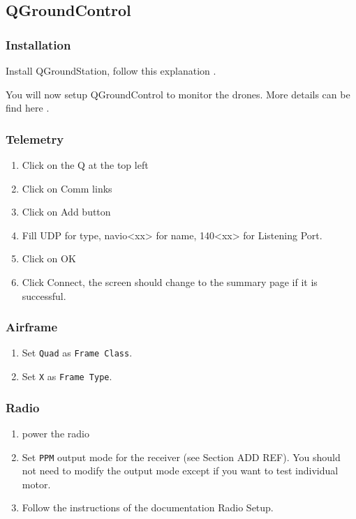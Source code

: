 \subsection{QGroundControl}
\subsubsection{Installation}
Install QGroundStation, follow this explanation \cite{qgc_install}.

You will now setup QGroundControl to monitor the drones. More details can be find here \cite{qgc_setup}.

\subsubsection{Telemetry}
\begin{enumerate}
    \item Click on the Q at the top left
    \item Click on Comm links
    \item Click on Add button
    \item Fill UDP for type, navio<xx> for name, 140<xx> for Listening Port.
    \item Click on OK
    \item Click Connect, the screen should change to the summary page if it is successful.
\end{enumerate}

\subsubsection{Airframe}
\begin{enumerate}
    \item Set \texttt{Quad} as \texttt{Frame Class}.
    \item Set \texttt{X} as \texttt{Frame Type}.
\end{enumerate}

\subsubsection{Radio}
\begin{enumerate}
    \item power the radio
    \item Set \texttt{PPM} output mode for the receiver (see Section ADD REF). You should not need to modify the output mode except if you want to test individual motor.
    \item Follow the instructions of the documentation Radio Setup.
\end{enumerate}

